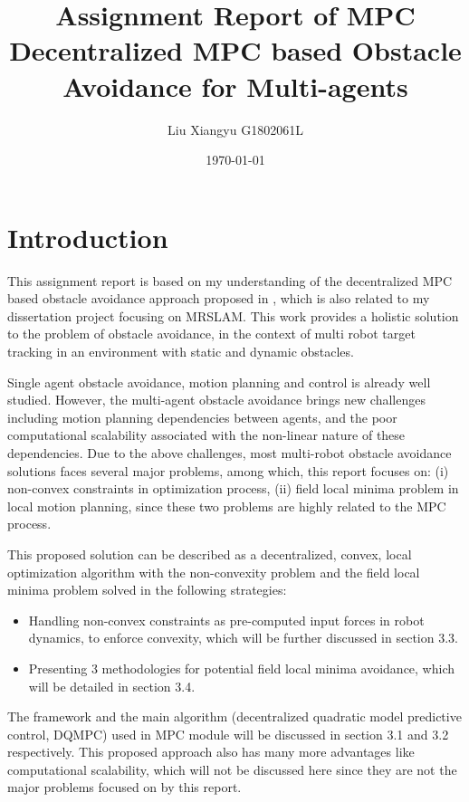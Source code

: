 \documentclass[12pt]{article}
\begin{document}
\title{Assignment Report of MPC\\
	 \large Decentralized MPC based Obstacle Avoidance for Multi-agents}
\author{Liu Xiangyu G1802061L}
\date{\today}
\maketitle

\section{Introduction}
This assignment report is based on my understanding of the decentralized MPC based obstacle avoidance approach proposed in \cite{tallamraju2018decentralized}, which is also related to my dissertation project focusing on MRSLAM. This work provides a holistic solution to the problem of obstacle avoidance, in the context of multi robot target tracking in an environment with static and dynamic obstacles.

Single agent obstacle avoidance, motion planning and control is already well studied. However, the multi-agent obstacle avoidance brings new challenges including motion planning dependencies between agents, and the poor computational scalability associated with the non-linear nature of these dependencies. Due to the above challenges, most multi-robot obstacle avoidance solutions faces several major problems, among which, this report focuses on: (i) non-convex constraints in optimization process, (ii) field local minima problem in local motion planning, since these two problems are highly related to the MPC process.

 This proposed solution can be described as a decentralized, convex, local optimization algorithm with the non-convexity problem and the field local minima problem solved in the following strategies:

\begin{itemize}
\item Handling non-convex constraints as pre-computed input forces in robot dynamics, to enforce convexity, which will be further discussed in section 3.3.
\item Presenting 3 methodologies for potential field local minima avoidance, which will be detailed in section 3.4.
\end{itemize}

The framework and the main algorithm (decentralized quadratic model predictive control, DQMPC) used in MPC module will be discussed in section 3.1 and 3.2 respectively. This proposed approach also has many more advantages like computational scalability, which will not be discussed here since they are not the major problems focused on by this report.
\end{document}
